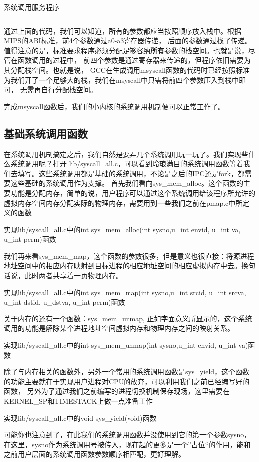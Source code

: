 \begin{codeBoxWithCaption}{系统调用服务程序\label{code:handlesys.S}}
  \inputminted[linenos]{gas}{codes/handlesys.S}
\end{codeBoxWithCaption}

通过上面的代码，我们可以知道，所有的参数都应当按照顺序放入栈中。根据MIPS的ABI标准，前4个参数通过a0-a3寄存器传递，
后面的参数通过栈了传递。值得注意的是，标准要求程序必须分配足够容纳\textbf{所有}参数的栈空间。也就是说，尽管在函数调用的过程中，
前四个参数是通过寄存器来传递的，但程序依旧需要为其分配栈空间。也就是说，
GCC在生成调用msyscall函数的代码时已经按照标准为我们开了一个足够大的栈，我们在msyscall中只需将前四个参数压入到栈中即可，
无需再自行分配栈空间。

完成msyscall函数后，我们的小内核的系统调用机制便可以正常工作了。

\subsection{基础系统调用函数}

在系统调用机制搞定之后，我们自然是要弄几个系统调用玩一玩了。我们实现些什么系统调用呢？打开 lib/syscall\_all.c，可以看到玲琅满目的系统调用函数等着我们去填写。这些系统调用都是基础的系统调用，不论是之后的IPC还是fork，都需要这些基础的系统调用作为支撑。
首先我们看向sys\_mem\_alloc。这个函数的主要功能是分配内存，简单的说，用户程序可以通过这个系统调用给该程序所允许的虚拟内存空间内存分配实际的物理内存，需要用到一些我们之前在pmap.c中所定义的函数
\begin{exercise}
实现lib/syscall\_all.c中的int sys\_mem\_alloc(int sysno,u\_int envid, u\_int va, u\_int perm)函数
\end{exercise}
我们再来看sys\_mem\_map，这个函数的参数很多，但是意义也很直接：将源进程地址空间中的相应内存映射到目标进程的相应地址空间的相应虚拟内存中去。换句话说，此时两者共享着一页物理内存。
\begin{exercise}
实现lib/syscall\_all.c中的int sys\_mem\_map(int sysno,u\_int srcid, u\_int srcva, u\_int dstid, u\_dstva, u\_int perm)函数
\end{exercise}
关于内存的还有一个函数：sys\_mem\_unmap, 正如字面意义所显示的，这个系统调用的功能是解除某个进程地址空间虚拟内存和物理内存之间的映射关系。
\begin{exercise}
实现lib/syscall\_all.c中的int sys\_mem\_unmap(int sysno,u\_int envid, u\_int va)函数
\end{exercise}
除了与内存相关的函数外，另外一个常用的系统调用函数是sys\_yield，这个函数的功能主要就在于实现用户进程对CPU的放弃，可以利用我们之前已经编写好的函数，
另外为了通过我们之前编写的进程切换机制保存现场，这里需要在KERNEL\_SP和TIMESTACK上做一点准备工作
\begin{exercise}
实现lib/syscall\_all.c中的void sys\_yield(void)函数
\end{exercise}
可能你也注意到了，在此我们的系统调用函数并没使用到它的第一个参数sysno，在这里，sysno作为系统调用号被传入，现在起的更多是一个”占位“的作用，能和之前用户层面的系统调用函数参数顺序相匹配，更好理解。
